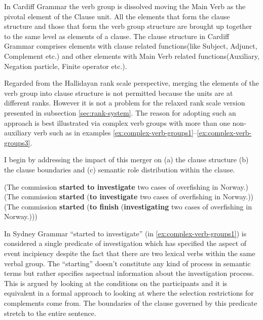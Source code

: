 In Cardiff Grammar the verb group is dissolved moving the Main Verb as the pivotal element of the Clause unit. All the elements that form the clause structure and those that form the verb group structure are brought up together to the same level as elements of a clause. The clause structure in Cardiff Grammar comprises elements with clause related functions(like Subject, Adjunct, Complement etc.) and other elements with Main Verb related functions(Auxiliary, Negation particle, Finite operator etc.).

Regarded from the Hallidayan rank scale perspective, merging the elements of the verb group into clause structure is not permitted because the units are at different ranks. However it is not a problem for the relaxed rank scale version presented in subsection \ref{sec:rank-system}. The reason for adopting such an approach is best illustrated via complex verb groups with more than one non-auxiliary verb such as in examples \ref{ex:complex-verb-groups1}--\ref{ex:complex-verb-groups3}. 

I begin by addressing the impact of this merger on (a) the clause structure (b) the clause boundaries and (c) semantic role distribution within the clause.

\begin{exe}
	\ex\label{ex:complex-verb-groups1}
	(The commission \textbf{started to investigate} two cases of overfishing in Norway.)  
	\ex\label{ex:complex-verb-groups2}
	(The commission \textbf{started} (\textbf{to investigate} two cases of overfishing in Norway.))
	\ex\label{ex:complex-verb-groups3}
	(The commission \textbf{started} (\textbf{to finish} (\textbf{investigating} two cases of overfishing in Norway.)))
\end{exe}

In Sydney Grammar ``started to investigate'' (in \ref{ex:complex-verb-groups1}) is considered a single predicate of investigation which has specified the aspect of event incipiency despite the fact that there are two lexical verbs within the same verbal group. The ``starting'' doesn't constitute any kind of process in semantic terms but rather specifies aspectual information about the investigation process. 
This is argued by looking at the conditions on the participants and it is equivalent in a formal approach to looking at where the selection restrictions for complements come from.
The boundaries of the clause governed by this predicate stretch to the entire sentence.

